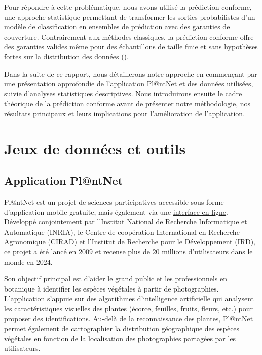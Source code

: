 \documentclass[a4paper,12pt]{article}
\begin{document}
\vspace{0.2cm}

Pour répondre à cette problématique, nous avons utilisé la prédiction conforme, une approche statistique permettant de transformer les sorties probabilistes d'un modèle de classification en ensembles de prédiction avec des garanties de couverture. Contrairement aux méthodes classiques, la prédiction conforme offre des garanties valides même pour des échantillons de taille finie et sans hypothèses fortes sur la distribution des données (\cite{Angelopoulos}).

\vspace{0.2cm}

Dans la suite de ce rapport, nous détaillerons notre approche en commençant par une présentation approfondie de l'application Pl@ntNet et des données utilisées, suivie d'analyses statistiques descriptives. Nous introduirons ensuite le cadre théorique de la prédiction conforme avant de présenter notre méthodologie, nos résultats principaux et leurs implications pour l'amélioration de l'application.


\section{Jeux de données et outils}


\subsection{Application Pl@ntNet}

Pl@ntNet est un projet de sciences participatives accessible sous forme d’application mobile gratuite, mais également via une \href{https://identify.plantnet.org/fr}{interface en ligne}. Développé conjointement par l'Institut National de Recherche Informatique et Automatique (INRIA), le Centre de coopération International en Recherche Agronomique (CIRAD) et l'Institut de Recherche pour le Développement (IRD), ce projet a été lancé en $2009$ et recense plus de $20$ millions d'utilisateurs dans le monde en $2024$. 

\vspace{0.2cm}

Son objectif principal est d'aider le grand public et les professionnels en botanique à identifier les espèces végétales à partir de photographies. L'application s'appuie sur des algorithmes d'intelligence artificielle qui analysent les caractéristiques visuelles des plantes (écorce, feuilles, fruits, fleurs, etc.) pour proposer des identifications. Au-delà de la reconnaissance des plantes, Pl@ntNet permet également de cartographier la distribution géographique des espèces végétales en fonction de la localisation des photographies partagées par les utilisateurs.
\end{document}
